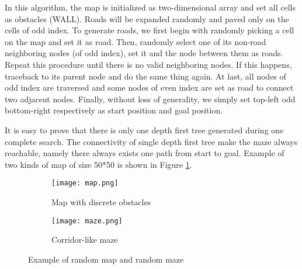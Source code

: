 In this algorithm, the map is initialized as two-dimensional array and set 
all cells as obstacles (WALL). Roads will be expanded randomly and paved only 
on the cells of odd index. To generate roads, we first begin with randomly 
picking a cell on the map and set it as road. Then, randomly select one of its 
non-road neighboring nodes (of odd index), set it and the node between them 
as roads. Repeat this procedure until there is no valid neighboring nodes. 
If this happens, traceback to its parent node and do the same thing again. At
last, all nodes of odd index are traversed and some nodes of even index are
set as road to connect two adjacent nodes. Finally, without loss of generality,
we simply set top-left odd bottom-right respectively as start position and goal
position.

It is easy to prove that there is only one depth first tree generated during one 
complete search. The connectivity of single depth first tree make the maze 
always reachable, namely there always exists one path from start to goal. 
Example of two kinds of map of size 50*50 is shown in Figure \ref{fig:map-and-maze}.

\begin{figure}
  \centering
  \begin{subfigure}[b]{0.45\textwidth}
    \texttt{[image: map.png]}
    \caption{Map with discrete obstacles}
  \end{subfigure}
  \begin{subfigure}[b]{0.45\textwidth}
    \texttt{[image: maze.png]}
    \caption{Corridor-like maze}
  \end{subfigure}
  \caption{Example of random map and random maze}
  \label{fig:map-and-maze}
\end{figure}

